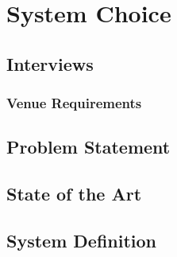 \chapter{System Choice}


\section{Interviews}





\subsection{Venue Requirements}


\section{Problem Statement}
\label{ProblemStatement}


\section{State of the Art}
\label{StateOfTheArt}


\section{System Definition}

